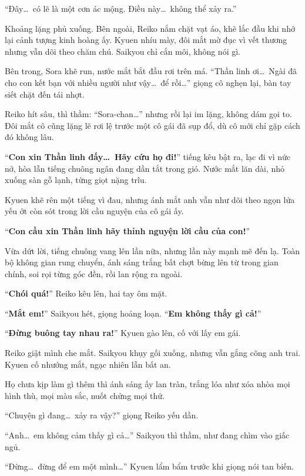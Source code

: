 \documentclass[../main.tex]{subfiles}
\begin{document}
``Đây\dots\ có lẽ là một cơn ác mộng. Điều này\dots\ không thể xảy ra.''

Khoảng lặng phủ xuống. Bên ngoài, Reiko nắm chặt vạt áo, khẽ lắc đầu khi nhớ lại cảnh tượng kinh hoàng ấy. Kyuen nhíu mày, đôi mắt mờ đục vì vết thương nhưng vẫn dõi theo chăm chú. Saikyou chỉ cắn môi, không nói gì.

Bên trong, Sora khẽ run, nước mắt bắt đầu rơi trên má. ``Thần linh ơi\dots\ Ngài đã cho con kết bạn với nhiều người như vậy\dots\ để rồi\dots'' giọng cô nghẹn lại, bàn tay siết chặt đến tái nhợt.


Reiko hít sâu, thì thầm: ``Sora-chan\dots'' nhưng rồi lại im lặng, không dám gọi to. Đôi mắt cô cũng lặng lẽ rơi lệ trước một cô gái đã sụp đổ, dù cô mới chỉ gặp cách đó không lâu.

``\textbf{Con xin Thần linh đấy\dots\ Hãy cứu họ đi!}'' tiếng kêu bật ra, lạc đi vì nức nở, hòa lẫn tiếng chuông ngân đang dần tắt trong gió. Nước mắt lăn dài, nhỏ xuống sàn gỗ lạnh, từng giọt nặng trĩu.

Kyuen khẽ rên một tiếng vì đau, nhưng ánh mắt anh vẫn như dõi theo ngọn lửa yếu ớt còn sót trong lời cầu nguyện của cô gái ấy.

``\textbf{Con cầu xin Thần linh hãy thỉnh nguyện lời cầu của con!}''

Vừa dứt lời, tiếng chuông vang lên lần nữa, nhưng lần này mạnh mẽ đến lạ. Toàn bộ không gian rung chuyển, ánh sáng trắng bất chợt bừng lên từ trong gian chính, soi rọi từng góc đền, rồi lan rộng ra ngoài.


``\textbf{Chói quá!}'' Reiko kêu lên, hai tay ôm mặt.

``\textbf{Mắt em!}'' Saikyou hét, giọng hoảng loạn. ``\textbf{Em không thấy gì cả!}''

``\textbf{Đừng buông tay nhau ra!}'' Kyuen gào lên, cố với lấy em gái.

Reiko giật mình che mắt. Saikyou khụy gối xuống, nhưng vẫn gắng cõng anh trai. Kyuen cố nhướng mắt, ngạc nhiên lẫn bất an.

Họ chưa kịp làm gì thêm thì ánh sáng ấy lan tràn, trắng lóa như xóa nhòa mọi hình thù, mọi màu sắc, nuốt chửng mọi thứ.

``Chuyện gì đang\dots\ xảy ra vậy?'' giọng Reiko yếu dần.

``Anh\dots\ em không cảm thấy gì cả\dots'' Saikyou thì thầm, như đang chìm vào giấc ngủ.

``Đừng\dots\ đừng để em một mình\dots'' Kyuen lẩm bẩm trước khi giọng nói tan biến.
\end{document}
